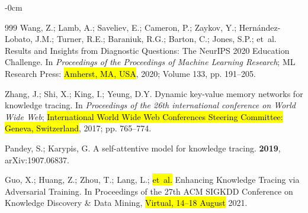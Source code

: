 \documentclass[applsci,article,accept,moreauthors,pdftex]{Definitions/mdpi}
\begin{document}
\begin{adjustwidth}{-\extralength}{0cm}
\begin{thebibliography}{999}
Wang, Z.; Lamb, A.; Saveliev, E.; Cameron, P.; Zaykov, Y.;
  Hern{\'a}ndez-Lobato, J.M.; Turner, R.E.; Baraniuk, R.G.; Barton, C.; Jones,
  S.P.;  et~al.
\newblock Results and Insights from Diagnostic Questions: The NeurIPS 2020
  Education Challenge.
\newblock In \textit{Proceedings of the Proceedings of Machine Learning Research}; ML
  Research Press: \hl{Amherst, MA, USA},  2020; Volume 133, pp. 191--205.
\newblock 

Zhang, J.; Shi, X.; King, I.; Yeung, D.Y.
\newblock Dynamic key-value memory networks for knowledge tracing.
\newblock In \textit{Proceedings of the 26th international
  conference on World Wide Web}; \hl{International World Wide Web Conferences Steering Committee: Geneva, Switzerland},  2017; pp. 765--774.

Pandey, S.; Karypis, G.
\newblock A self-attentive model for knowledge tracing.
 {\bf 2019}, arXiv:1907.06837.

Guo, X.; Huang, Z.; Zhou, T.; Lang, L.;  \hl{et~al.} %
\newblock Enhancing Knowledge Tracing via Adversarial Training.
\newblock In Proceedings of the 27th ACM SIGKDD Conference
  on Knowledge Discovery \& Data Mining, \hl{Virtual, 14--18 August} 2021.

\end{thebibliography}




\end{adjustwidth}
\end{document}
